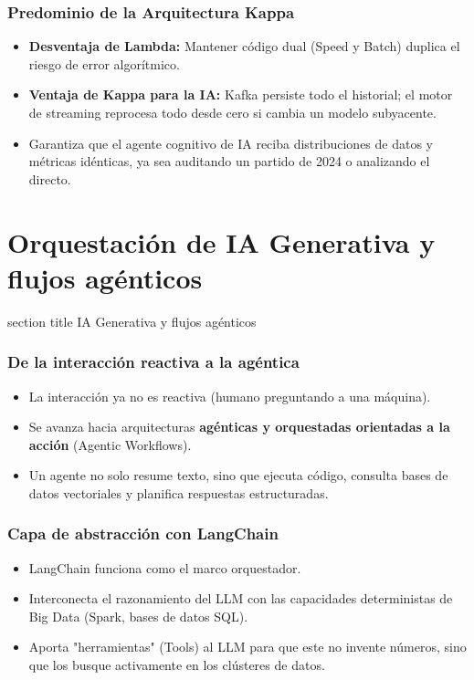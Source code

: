 \documentclass[aspectratio=169]{beamer}
\newcommand{\sectionpagetitle}[1]{
\begin{frame}
	\vspace{1cm}
	\begin{beamercolorbox}[sep=8pt,center,wd=\textwidth]{section title}
		\usebeamerfont{section title}#1\par
	\end{beamercolorbox}
\end{frame}
}
\begin{document}
\begin{frame}\frametitle{Predominio de la Arquitectura Kappa}
\begin{itemize}
    \item \textbf{Desventaja de Lambda:} Mantener código dual (Speed y Batch) duplica el riesgo de error algorítmico.
    \item \textbf{Ventaja de Kappa para la IA:} Kafka persiste todo el historial; el motor de streaming reprocesa todo desde cero si cambia un modelo subyacente.
    \item Garantiza que el agente cognitivo de IA reciba distribuciones de datos y métricas idénticas, ya sea auditando un partido de 2024 o analizando el directo.
\end{itemize}
\end{frame}

\section{Orquestación de IA Generativa y flujos agénticos}
\sectionpagetitle{IA Generativa y flujos agénticos}

\begin{frame}\frametitle{De la interacción reactiva a la agéntica}
\begin{itemize}
    \item La interacción ya no es reactiva (humano preguntando a una máquina).
    \item Se avanza hacia arquitecturas \textbf{agénticas y orquestadas orientadas a la acción} (Agentic Workflows).
    \item Un agente no solo resume texto, sino que ejecuta código, consulta bases de datos vectoriales y planifica respuestas estructuradas.
\end{itemize}
\end{frame}

\begin{frame}\frametitle{Capa de abstracción con LangChain}
\begin{itemize}
    \item LangChain funciona como el marco orquestador.
    \item Interconecta el razonamiento del LLM con las capacidades deterministas de Big Data (Spark, bases de datos SQL).
    \item Aporta "herramientas" (Tools) al LLM para que este no invente números, sino que los busque activamente en los clústeres de datos.
\end{itemize}
\end{frame}
\end{document}
